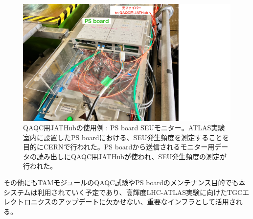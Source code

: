 \begin{figure}
\centering
\includegraphics[width=16cm]{fig/QAQC/JATHubSEU.pdf}
\caption[QAQC用JATHubの使用例 : PS board SEUモニター]{QAQC用JATHubの使用例 : PS board SEUモニター\cite{mt_hashimoto}。ATLAS実験室内に設置したPS boardにおける、SEU発生頻度を測定することを目的にCERNで行われた。PS boardから送信されるモニター用データの読み出しにQAQC用JATHubが使われ、SEU発生頻度の測定が行われた。}
\label{JATHubSEU}
\end{figure}

その他にもTAMモジュールのQAQC試験やPS boardのメンテナンス目的でも本システムは利用されていく予定であり、高輝度LHC-ATLAS実験に向けたTGCエレクトロニクスのアップデートに欠かせない、重要なインフラとして活用される。
